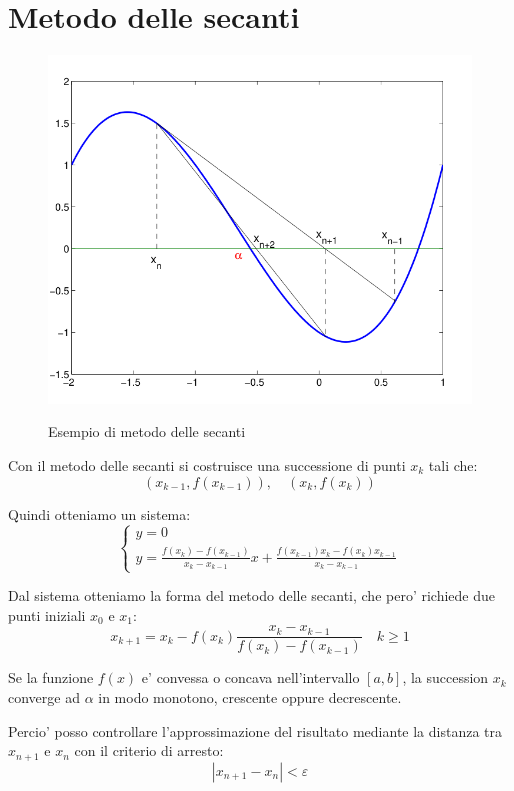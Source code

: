 \section{Metodo delle secanti}
\begin{figure}[h!]
  \centering
  \includegraphics[width=0.5\linewidth]{./images/secanti.png}
  \label{fig:secanti}
  \caption{Esempio di metodo delle secanti}
\end{figure}
Con il metodo delle secanti si costruisce una successione di punti ${x_k}$ tali che:
\begin{equation} 
  (x_{k-1}, f(x_{k-1})), \quad (x_k, f(x_k))
\end{equation}

Quindi otteniamo un sistema:
\begin{equation}
  \begin{cases}
    y = 0 \\
    y = \frac{f(x_k)-f(x_{k-1})}{x_k-x_{k-1}} x + \frac{f(x_{k-1})x_k-f(x_k)x_{k-1}}{x_k-x_{k-1}}
  \end{cases}
\end{equation}

Dal sistema otteniamo la forma del metodo delle secanti, che pero' richiede due punti iniziali
$x_0$ e $x_1$:
\begin{equation}
  x_{k+1} = x_k - f(x_k)\frac{x_k-x_{k-1}}{f(x_k)-f(x_{k-1})} \quad k\geq 1
\end{equation}

Se la funzione $f(x)$ e' convessa o concava nell'intervallo $[a, b]$, la succession
${x_k}$ converge ad $\alpha$ in modo monotono, crescente oppure decrescente.

Percio' posso controllare l'approssimazione del risultato mediante la distanza tra $x_{n+1}$ 
e $x_n$ con il criterio di arresto:
\begin{equation}
  |x_{n+1}-x_n| < \varepsilon
\end{equation}


